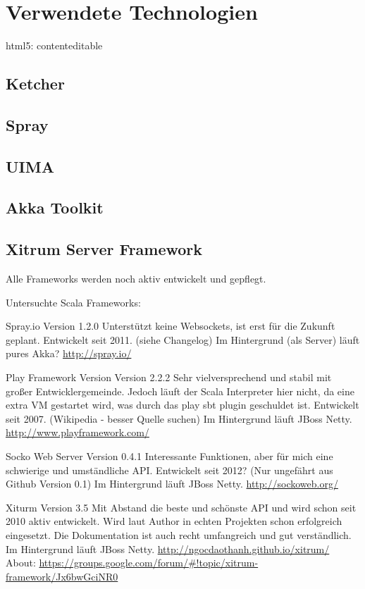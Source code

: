 \section{Verwendete Technologien}

html5: contenteditable

\subsection{Ketcher}

\subsection{Spray}

\subsection{UIMA}

\subsection{Akka Toolkit}

\subsection{Xitrum Server Framework}

Alle Frameworks werden noch aktiv entwickelt und gepflegt.

Untersuchte Scala Frameworks:

Spray.io Version 1.2.0
Unterstützt keine Websockets, ist erst für die Zukunft geplant.
Entwickelt seit 2011. (siehe Changelog)
Im Hintergrund (als Server) läuft pures Akka?
\url{http://spray.io/}

Play Framework Version Version 2.2.2
Sehr vielversprechend und stabil mit großer Entwicklergemeinde.
Jedoch läuft der Scala Interpreter hier nicht, da eine extra VM gestartet
wird, was durch das play sbt plugin geschuldet ist.
Entwickelt seit 2007. (Wikipedia - besser Quelle suchen)
Im Hintergrund läuft JBoss Netty.
\url{http://www.playframework.com/}

Socko Web Server Version 0.4.1
Interessante Funktionen, aber für mich eine schwierige und umständliche API.
Entwickelt seit 2012? (Nur ungefährt aus Github Version 0.1)
Im Hintergrund läuft JBoss Netty.
\url{http://sockoweb.org/}

Xiturm Version 3.5
Mit Abstand die beste und schönste API und wird schon seit 2010 aktiv entwickelt.
Wird laut Author in echten Projekten schon erfolgreich eingesetzt.
Die Dokumentation ist auch recht umfangreich und gut verständlich.
Im Hintergrund läuft JBoss Netty.
\url{http://ngocdaothanh.github.io/xitrum/}
About: \url{https://groups.google.com/forum/#!topic/xitrum-framework/Jx6bwGciNR0}


